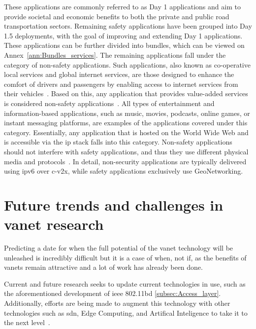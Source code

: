 These applications are commonly referred to as Day 1 applications and aim to provide societal and economic benefits to both the private and public road transportation sectors. Remaining safety applications have been grouped into Day 1.5 deployments, with the goal of improving and extending Day 1 applications. These applications can be further divided into bundles, which can be viewed on Annex~\ref{ann:Bundles_services}.
The remaining applications fall under the category of non-safety applications. Such applications, also known as co-operative local services and global internet services, are those designed to enhance the comfort of drivers and passengers by enabling access to internet services from their vehicles~\cite{al-sultan_comprehensive_2014}. Based on this, any application that provides value-added services is considered non-safety applications~\cite{toor_vehicle_2008}.
All types of entertainment and information-based applications, such as music, movies, podcasts, online games, or instant messaging platforms, are examples of the applications covered under this category. Essentially, any application that is hosted on the World Wide Web and is accessible via the \gls{ip} stack falls into this category.
Non-safety applications should not interfere with safety applications, and thus they use different physical media and protocols~\cite{jakubiak_state_2008}. In detail, non-security applications are typically delivered using \gls{ipv6} over \gls{c-v2x}, while safety applications exclusively use GeoNetworking.


\section[Future trends and challenges in VANET research]{Future trends and challenges in \gls{vanet} research}
\label{sec:vanet_future}

Predicting a date for when the full potential of the \gls{vanet} technology will be unleashed is incredibly difficult but it is a case of when, not if, as the benefits of \glspl{vanet} remain attractive and a lot of work has already been done. 

Current and future research seeks to update current technologies in use, such as the aforementioned development of \gls{ieee} 802.11bd \ref{subsec:Access_layer}. Additionally, efforts are being made to augment this technology with other technologies such as \gls{sdn}, Edge Computing, and Artifical Inteligence to take it to the next level~\cite{mahi_review_2022}.

